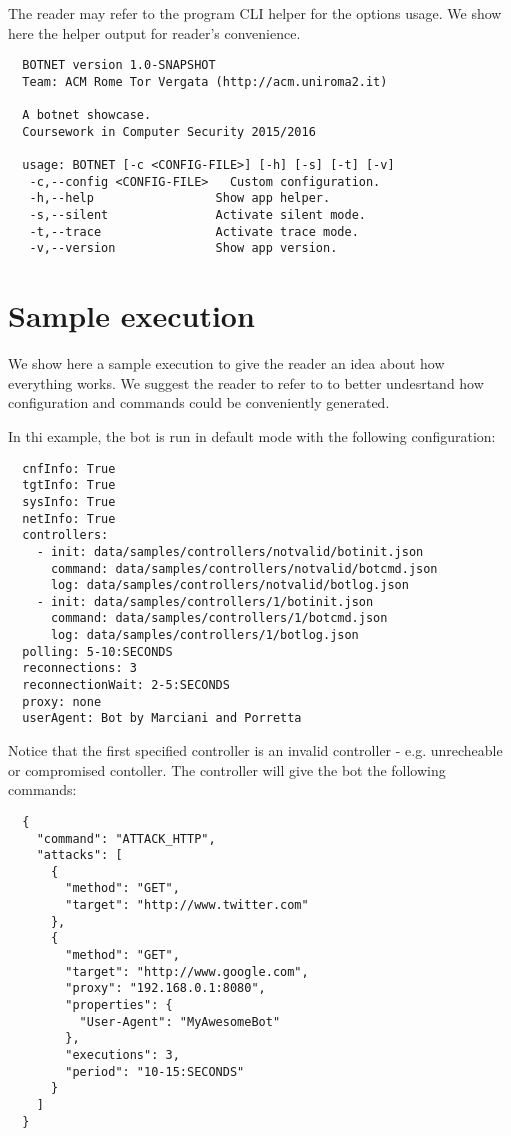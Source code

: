 The reader may refer to the program CLI helper for the options usage. We show here the helper output for reader's convenience.

\begin{verbatim}
  BOTNET version 1.0-SNAPSHOT
  Team: ACM Rome Tor Vergata (http://acm.uniroma2.it)

  A botnet showcase.
  Coursework in Computer Security 2015/2016

  usage: BOTNET [-c <CONFIG-FILE>] [-h] [-s] [-t] [-v]
   -c,--config <CONFIG-FILE>   Custom configuration.
   -h,--help                 Show app helper.
   -s,--silent               Activate silent mode.
   -t,--trace                Activate trace mode.
   -v,--version              Show app version.
\end{verbatim}


\section{Sample execution}
\label{sec:sample-execution}

We show here a sample execution to give the reader an idea about how everything works. We suggest the reader to refer to \cite{video-tutorial} to better undesrtand how configuration and commands could be conveniently generated.

In thi example, the bot is run in default mode with the following configuration:

\begin{verbatim}
  cnfInfo: True
  tgtInfo: True
  sysInfo: True
  netInfo: True
  controllers:
    - init: data/samples/controllers/notvalid/botinit.json
      command: data/samples/controllers/notvalid/botcmd.json
      log: data/samples/controllers/notvalid/botlog.json
    - init: data/samples/controllers/1/botinit.json
      command: data/samples/controllers/1/botcmd.json
      log: data/samples/controllers/1/botlog.json
  polling: 5-10:SECONDS
  reconnections: 3
  reconnectionWait: 2-5:SECONDS
  proxy: none
  userAgent: Bot by Marciani and Porretta
\end{verbatim}

Notice that the first specified controller is an invalid controller - e.g. unrecheable or compromised contoller.
The controller will give the bot the following commands:

\begin{verbatim}
  {
    "command": "ATTACK_HTTP",
    "attacks": [
      {
        "method": "GET",
        "target": "http://www.twitter.com"
      },
      {
        "method": "GET",
        "target": "http://www.google.com",
        "proxy": "192.168.0.1:8080",
        "properties": {
          "User-Agent": "MyAwesomeBot"
        },
        "executions": 3,
        "period": "10-15:SECONDS"
      }
    ]
  }
\end{verbatim}

